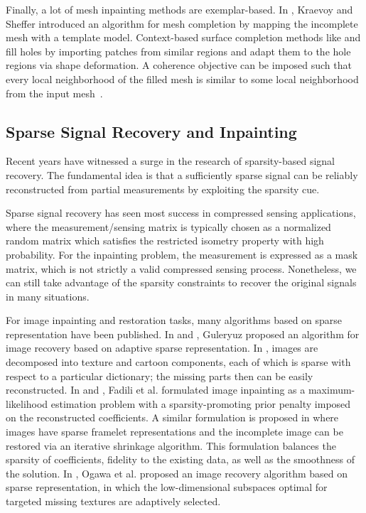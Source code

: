 Finally, a lot of mesh inpainting methods are exemplar-based. In
\cite{Kraevoy2005}, Kraevoy and Sheffer introduced an algorithm for
mesh completion by mapping the incomplete mesh with a template model.
Context-based surface completion methods like \cite{Sharf2004} and \cite{Park2005}
fill holes by importing patches from similar regions and adapt them
to the hole regions via shape deformation. A coherence objective can be imposed
such that every local neighborhood of the filled mesh is similar to some local
neighborhood from the input mesh~\cite{Harary2014}.

\subsection{Sparse Signal Recovery and Inpainting}

Recent years have witnessed a surge in the research of sparsity-based
signal recovery. The fundamental idea is that a sufficiently sparse
signal can be reliably reconstructed from partial measurements by
exploiting the sparsity cue.

Sparse signal recovery has seen most success in compressed sensing
applications, where the measurement/sensing matrix is typically chosen
as a normalized random matrix which satisfies the restricted isometry
property with high probability. For the inpainting problem, the
measurement is expressed as a mask matrix, which is not strictly a
valid compressed sensing process. Nonetheless, we can still take
advantage of the sparsity constraints to recover the original signals
in many situations.

For image inpainting and restoration tasks, many algorithms based on
 sparse representation have been published. In \cite{Guleryuz2006} and
\cite{Guleryuz2006a}, Guleryuz proposed an algorithm for image
recovery based on adaptive sparse representation. In \cite{Elad2005},
images are decomposed into texture and cartoon components, each of
which is sparse with respect to a particular dictionary; the missing
parts then can be easily reconstructed. In \cite{Fadili2005} and
\cite{Fadili2009}, Fadili et al. formulated image inpainting as a
maximum-likelihood estimation problem with a sparsity-promoting prior
penalty imposed on the reconstructed coefficients. A similar
formulation is proposed in \cite{Cai2008} where images have sparse
framelet representations and the incomplete image can be restored via
an iterative shrinkage algorithm. This formulation balances the
sparsity of coefficients, fidelity to the existing data, as well as
the smoothness of the solution. In \cite{Ogawa2011}, Ogawa et al.
proposed an image recovery algorithm based on sparse representation,
in which the low-dimensional subspaces optimal for targeted missing
textures are adaptively selected.

